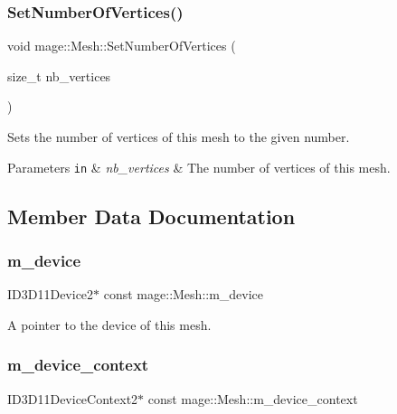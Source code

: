 \subsubsection{\texorpdfstring{Set\+Number\+Of\+Vertices()}{SetNumberOfVertices()}}
{\footnotesize\ttfamily void mage\+::\+Mesh\+::\+Set\+Number\+Of\+Vertices (\begin{DoxyParamCaption}\item[{size\+\_\+t}]{nb\+\_\+vertices }\end{DoxyParamCaption})\hspace{0.3cm}{\ttfamily [protected]}}

Sets the number of vertices of this mesh to the given number.


\begin{DoxyParams}[1]{Parameters}
\mbox{\tt in}  & {\em nb\+\_\+vertices} & The number of vertices of this mesh. \\
\hline
\end{DoxyParams}


\subsection{Member Data Documentation}
\hypertarget{classmage_1_1_mesh_ad1d91b6048d73bb05d0d39028d048f18}{}\label{classmage_1_1_mesh_ad1d91b6048d73bb05d0d39028d048f18} 
\subsubsection{\texorpdfstring{m\+\_\+device}{m\_device}}
{\footnotesize\ttfamily I\+D3\+D11\+Device2$\ast$ const mage\+::\+Mesh\+::m\+\_\+device\hspace{0.3cm}{\ttfamily [protected]}}

A pointer to the device of this mesh. \hypertarget{classmage_1_1_mesh_a1d19b5bceea2256f4d80ebc06fa74f00}{}\label{classmage_1_1_mesh_a1d19b5bceea2256f4d80ebc06fa74f00} 
\subsubsection{\texorpdfstring{m\+\_\+device\+\_\+context}{m\_device\_context}}
{\footnotesize\ttfamily I\+D3\+D11\+Device\+Context2$\ast$ const mage\+::\+Mesh\+::m\+\_\+device\+\_\+context\hspace{0.3cm}{\ttfamily [protected]}}


